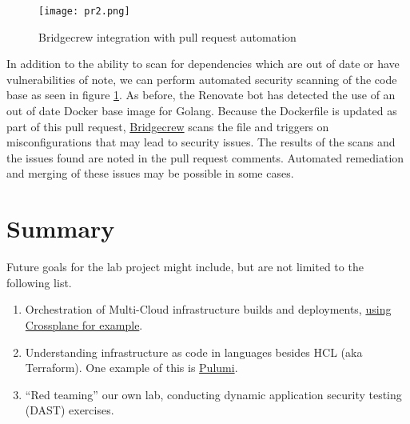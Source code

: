 \begin{figure}[H]
	\texttt{[image: pr2.png]}
	\caption{Bridgecrew integration with pull request automation}
	\label{pr2}
\end{figure}


In addition to the ability to scan for dependencies which are out of date or have vulnerabilities of note, we can perform automated security scanning
of the code base as seen in figure \ref{pr2}. As before, the Renovate bot has detected the use of an out of date Docker base image for Golang. Because
the Dockerfile is updated as part of this pull request, \href{https://docs.bridgecrew.io/docs}{Bridgecrew} scans the file and triggers on misconfigurations that may lead to security issues.
The results of the scans and the issues found are noted in the pull request comments. Automated remediation and merging of these issues may be possible in
some cases.


\section{\label{sec:Summary}Summary}
\vspace{2mm}
Future goals for the lab project might include, but are not limited to the following list.
\vspace{2mm}
\begin{raggedright}
	\begin{enumerate}
		\item Orchestration of Multi-Cloud infrastructure builds and deployments, \href{https://crossplane.io/docs/v1.3/}{using Crossplane for example}.
		\item Understanding infrastructure as code in languages besides HCL (aka Terraform). One example of this is \href{https://www.pulumi.com/}{Pulumi}.
		\item ``Red teaming'' our own lab, conducting dynamic application security testing (DAST) exercises.
	\end{enumerate}
\end{raggedright}
\vspace{2mm}


\clearpage
\begin{versionhistory}
\end{versionhistory}
\nocite{*}




